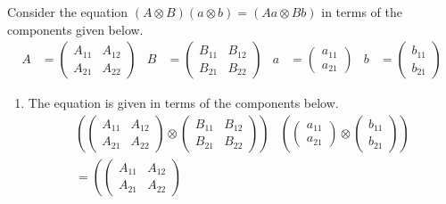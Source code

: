 \begin{answer}
	Consider the equation $\left(A \otimes B\right) \left(a \otimes b\right) = \left(Aa \otimes Bb\right)$ in terms of the components given below.
	\begin{align*}
		A & =
		\begin{pmatrix}
			A_{11} & A_{12} \\
			A_{21} & A_{22}
		\end{pmatrix}
		  &
		B & =
		\begin{pmatrix}
			B_{11} & B_{12} \\
			B_{21} & B_{22}
		\end{pmatrix}
		  &
		a & =
		\begin{pmatrix}
			a_{11} \\ a_{21}
		\end{pmatrix}
		  &
		b & =
		\begin{pmatrix}
			b_{11} \\ b_{21}
		\end{pmatrix}
	\end{align*}
	\begin{enumerate}
		\item The equation is given in terms of the components below.
		      \begin{align*}
			      \left(
			      \begin{pmatrix}
				      A_{11} & A_{12} \\
				      A_{21} & A_{22}
			      \end{pmatrix}
			      \otimes
			      \begin{pmatrix}
				      B_{11} & B_{12} \\
				      B_{21} & B_{22}
			      \end{pmatrix}
			      \right) & \left(
			      \begin{pmatrix}
				      a_{11} \\ a_{21}
			      \end{pmatrix}
			      \otimes
			      \begin{pmatrix}
				      b_{11} \\ b_{21}
			      \end{pmatrix}
			      \right)           \\
			      = \left(
			      \begin{pmatrix}
				      A_{11} & A_{12} \\
				      A_{21} & A_{22}
			      \end{pmatrix}

\end{align*}
\end{enumerate}
\end{answer}
